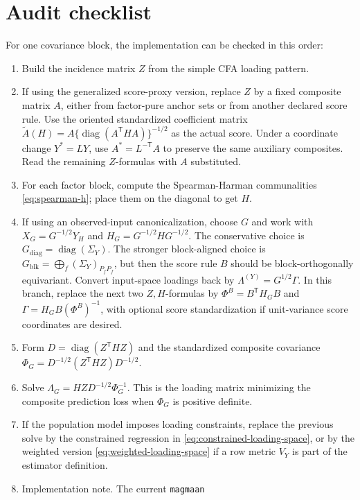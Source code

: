 \documentclass[11pt]{article}
\newcommand{\T}{^{\mathsf T}}
\newcommand{\diag}{\operatorname{diag}}
\theoremstyle{plain}
\theoremstyle{remark}
\begin{document}
\section{Audit checklist}

For one covariance block, the implementation can be checked in this order:
\begin{enumerate}
\item Build the incidence matrix \(Z\) from the simple CFA loading pattern.
\item If using the generalized score-proxy version, replace \(Z\) by a fixed
  composite matrix \(A\), either from factor-pure anchor sets or from another
  declared score rule. Use the oriented standardized coefficient matrix
  \(\widetilde A(H)=A\{\diag(A\T H A)\}^{-1/2}\) as the actual score. Under a
  coordinate change \(Y^\ast=LY\), use \(A^\ast=L^{-\mathsf T}A\) to preserve
  the same auxiliary composites. Read the remaining \(Z\)-formulas with \(A\)
  substituted.
\item For each factor block, compute the Spearman-Harman communalities
  \eqref{eq:spearman-h}; place them on the diagonal to get \(H\).
\item If using an observed-input canonicalization, choose \(G\) and work with
  \(X_G=G^{-1/2}Y_H\) and \(H_G=G^{-1/2}HG^{-1/2}\). The conservative choice is
  \(G_{\mathrm{diag}}=\diag(\Sigma_Y)\). The stronger block-aligned choice is
  \(G_{\mathrm{blk}}=\bigoplus_f(\Sigma_Y)_{P_fP_f}\), but then the score rule
  \(B\) should be block-orthogonally equivariant. Convert input-space loadings
  back by \(\Lambda^{(Y)}=G^{1/2}\Gamma\). In this branch, replace the next
  two \(Z,H\)-formulas by
  \(\Phi^B=B\T H_GB\) and \(\Gamma=H_GB(\Phi^B)^{-1}\), with optional score
  standardization if unit-variance score coordinates are desired.
\item Form \(D=\diag(Z\T HZ)\) and the standardized composite covariance
  \(\Phi_G=D^{-1/2}(Z\T HZ)D^{-1/2}\).
\item Solve \(\Lambda_G=HZD^{-1/2}\Phi_G^{-1}\). This is the loading matrix
  minimizing the composite prediction loss when \(\Phi_G\) is positive
  definite.
\item If the population model imposes loading constraints, replace the previous
  solve by the constrained regression in
  \eqref{eq:constrained-loading-space}, or by the weighted version
  \eqref{eq:weighted-loading-space} if a row metric \(V_Y\) is part of the
  estimator definition.
\item Implementation note. The current \texttt{magmaan}

\end{enumerate}
\end{document}

